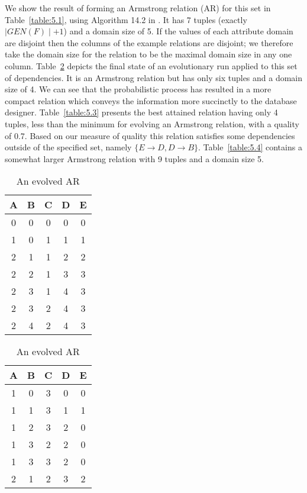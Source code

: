 \begin{example}
\begin{rm}
We show the result of forming an Armstrong relation (AR) for this set
in Table~\ref{table:5.1}, using Algorithm 14.2 in \cite{Mann92}. It has
7 tuples (exactly $\mid GEN(F) \mid + 1$) and a domain size of 5. If
 the values of each attribute domain are disjoint then the columns
of the example relations are disjoint; we therefore take the domain size
 for
the relation to be the maximal domain size in any one column. Table~\ref{table:5.2} depicts the final state of an evolutionary run applied to
this set of dependencies. It is an Armstrong relation but has only
six tuples and a domain size of 4. We can see that the probabilistic
process has resulted in a more compact relation which conveys the information
more succinctly to the database designer.  Table~\ref{table:5.3} presents
the best attained relation having only 4 tuples, less than the
minimum for evolving an Armstrong relation, with a quality of 0.7. Based on our
measure of quality this relation satisfies some dependencies outside of
the specified set, namely $\{ E \to D, D \to B \}$. Table~\ref{table:5.4} contains
a somewhat larger Armstrong relation with 9 tuples and a domain size 5.
\end{rm}
\end{example}

{\line
\begin{table}[ht]
\begin{minipage}[t]{8cm}
\begin{center}
\begin{tabular}{|c|c|c|c|c|} \hline 
{ \bf A } & { \bf B} & {\bf  C }  & { \bf D }  & {\bf E} \\ \hline
0 & 0 & 0 & 0 & 0 \\
1 & 0 & 1 & 1 & 1 \\
2 & 1 & 1 & 2 & 2 \\
2 & 2 & 1 & 3 & 3 \\
2 & 3 & 1 & 4 & 3 \\
2 & 3 & 2 & 4 & 3 \\
2 & 4 & 2 & 4 & 3 \\ \hline
\end{tabular}
\end{center}
\caption{\label{table:5.1} Standard AR}
\end{minipage}
\hfill
\begin{minipage}[t]{8cm}
\begin{center}
\begin{tabular}{|c|c|c|c|c|} \hline 
{ \bf A } & { \bf B} & {\bf  C }  & { \bf D }  & {\bf E} \\ \hline
1 & 0 & 3 & 0 & 0 \\
1 & 1 & 3 & 1 & 1 \\ 
1 & 2 & 3 & 2 & 0 \\
1 & 3 & 2 & 2 & 0 \\
1 & 3 & 3 & 2 & 0 \\
2 & 1 & 2 & 3 & 2 \\ \hline
\end{tabular}
\end{center}
\caption{\label{table:5.2} An evolved AR }
\end{minipage}
\end{table}
}

